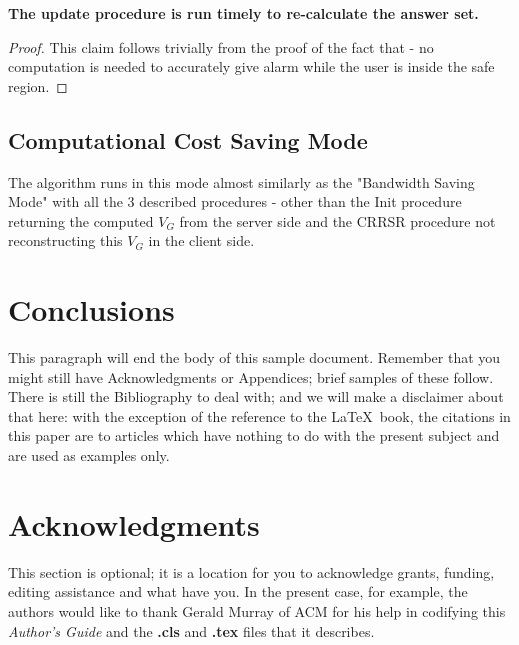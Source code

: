 \documentclass{sig-alternate}
\begin{document}
\textbf{The update procedure is run timely to re-calculate the answer set.}
\begin{proof} 
This claim follows trivially from the proof of the fact that - no computation is needed to accurately give alarm while the user is inside the safe region.
\end{proof}

\subsection{Computational Cost Saving Mode}
The algorithm runs in this mode almost similarly as the "Bandwidth Saving Mode" with all the 3 described procedures - other than the Init procedure returning the computed $V_G$ from the server side and the CRRSR procedure not reconstructing this $V_G$ in the client side.


\section{Conclusions}
This paragraph will end the body of this sample document.
Remember that you might still have Acknowledgments or
Appendices; brief samples of these
follow.  There is still the Bibliography to deal with; and
we will make a disclaimer about that here: with the exception
of the reference to the \LaTeX\ book, the citations in
this paper are to articles which have nothing to
do with the present subject and are used as
examples only.

\section{Acknowledgments}
This section is optional; it is a location for you
to acknowledge grants, funding, editing assistance and
what have you.  In the present case, for example, the
authors would like to thank Gerald Murray of ACM for
his help in codifying this \textit{Author's Guide}
and the \textbf{.cls} and \textbf{.tex} files that it describes.

%

%
%
\appendix
\end{document}
